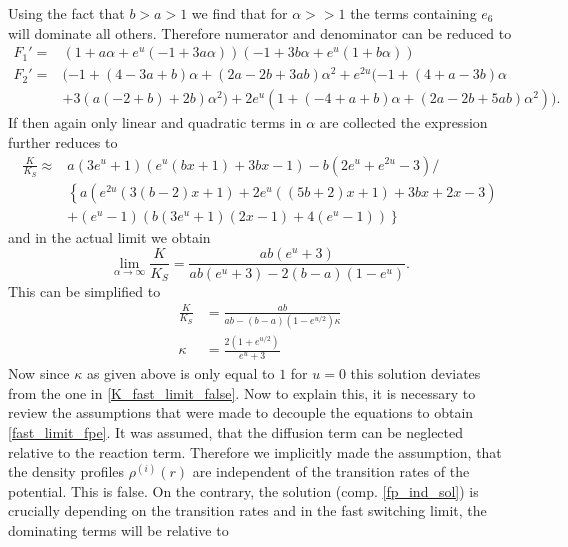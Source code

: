Using the fact that $b > a > 1$ we find that for $\alpha >>1$ the terms containing $e_6$ will dominate all others. Therefore numerator and denominator can be reduced to
\begin{align*}
    F_1' =& ( 1 + a \alpha + e^u (-1 + 3 a \alpha)) (-1 + 3 b \alpha + e^u (1 + b \alpha))\\
    F_2' =& (-1 + (4 - 3 a + b) \alpha + (2 a - 2 b + 3 a b) \alpha^2 + e^{2 u} (-1 + (4 + a - 3 b) \alpha \\
          &+ 3 (a (-2 + b) + 2 b) \alpha^2) + 2 e^u (1 + (-4 + a + b) \alpha + (2 a - 2 b + 5 a b) \alpha^2)).
\end{align*}
If then again only linear and quadratic terms in $\alpha$ are collected the expression further reduces to 
\begin{align}
    \frac{K}{K_{S}} \approx &a \left(3 e^u+1\right) \left(e^u (b x+1)+3 b x-1\right)-b \left(2 e^u+e^{2 u}-3\right) / \nonumber \\
                          &\left\{a \left(e^{2 u} (3 (b-2) x+1)+2 e^u ((5 b+2) x+1)+3 b x+2 x-3\right) \right.  \nonumber \\
                          & \left. +\left(e^u-1\right) \left(b \left(3 e^u+1\right) (2 x-1)+4 \left(e^u-1\right)\right) \right\}
    \label{kla}
\end{align}
and in the actual limit we obtain 
\begin{equation}
    \lim_{\alpha \rightarrow \infty} \frac{K}{K_{S}} = \frac{a b \left(e^u+3\right)}{ab \left(e^u+3\right)-2(b-a)(1-e^u)}.
    \label{kliminfa}
\end{equation}
This can be simplified to 
\begin{align}
    \frac{K}{K_S} &= \frac{ab}{ab - (b-a)(1-e^{u/2}) \kappa} \\
    \kappa &= \frac{2(1+e^{u/2})}{e^u + 3}
    \label{K_fast_limit_correct}
\end{align}
Now since $\kappa$ as given above is only equal to $1$ for $u=0$ this solution deviates from the one in \eqref{K_fast_limit_false}. Now to explain this, it is necessary to review the assumptions that were made to decouple the equations to obtain \eqref{fast_limit_fpe}. It was assumed, that the diffusion term can be neglected relative to the reaction term. Therefore we
implicitly made the assumption, that the density profiles $\rho^{(i)}(r)$ are independent of the transition rates of the potential. This is false. On the contrary, the solution (comp. \eqref{fp_ind_sol}) is crucially depending on the transition rates and in the fast switching limit, the dominating terms will be relative to
